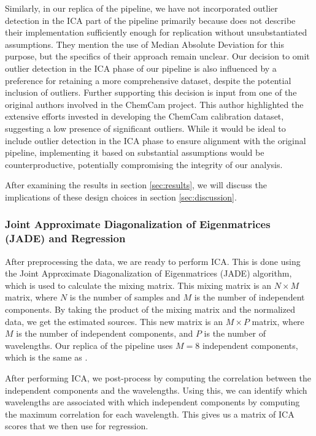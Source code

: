 Similarly, in our replica of the pipeline, we have not incorporated outlier detection in the ICA part of the pipeline primarily because \citet{cleggRecalibrationMarsScience2017} does not describe their implementation sufficiently enough for replication without unsubstantiated assumptions.
They mention the use of Median Absolute Deviation for this purpose, but the specifics of their approach remain unclear.
Our decision to omit outlier detection in the ICA phase of our pipeline is also influenced by a preference for retaining a more comprehensive dataset, despite the potential inclusion of outliers.
Further supporting this decision is input from one of the original authors involved in the ChemCam project.
This author highlighted the extensive efforts invested in developing the ChemCam calibration dataset, suggesting a low presence of significant outliers.
While it would be ideal to include outlier detection in the ICA phase to ensure alignment with the original pipeline, implementing it based on substantial assumptions would be counterproductive, potentially compromising the integrity of our analysis.

After examining the results in section \ref{sec:results}, we will discuss the implications of these design choices in section \ref{sec:discussion}.

\subsubsection{Joint Approximate Diagonalization of Eigenmatrices (JADE) and Regression}
After preprocessing the data, we are ready to perform ICA.
This is done using the Joint Approximate Diagonalization of Eigenmatrices (JADE) algorithm, which is used to calculate the mixing matrix.
This mixing matrix is an $N \times M$ matrix, where $N$ is the number of samples and $M$ is the number of independent components.
By taking the product of the mixing matrix and the normalized data, we get the estimated sources.
This new matrix is an $M \times P$ matrix, where $M$ is the number of independent components, and $P$ is the number of wavelengths.
Our replica of the pipeline uses $M = 8$ independent components, which is the same as \citet{cleggRecalibrationMarsScience2017}.

After performing ICA, we post-process by computing the correlation between the independent components and the wavelengths.
Using this, we can identify which wavelengths are associated with which independent components by computing the maximum correlation for each wavelength.
This gives us a matrix of ICA scores that we then use for regression.

